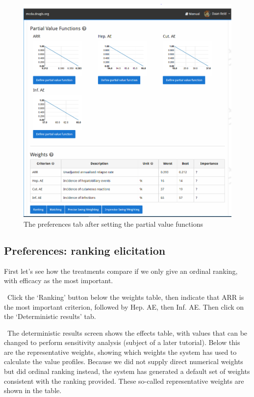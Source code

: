 \documentclass[00_mcda_tutorial.tex]{subfiles}
\begin{document}
\begin{figure}[!h]
    \centering
	\includegraphics[width=\textwidth]{fig/preferences.png}
    \caption{The preferences tab after setting the partial value functions}
	\label{fig:preferences}
\end{figure}

\subsection*{Preferences: ranking elicitation}
First let’s see how the treatments compare if we only give an ordinal ranking, with efficacy as the most important.
\newline

\noindent \leftpointright \, Click the ‘Ranking’ button below the weights table, then indicate that ARR is the most important criterion, followed by Hep. AE, then Inf. AE. Then click on the ‘Deterministic results’ tab.
\newline

\noindent \faGraduationCap \, The deterministic results screen shows the effects table, with values that can be changed to perform sensitivity analysis (subject of a later tutorial). Below this are the representative weights, showing which weights the system has used to calculate the value profiles. Because we did not supply direct numerical weights but did ordinal ranking instead, the system has generated a default set of weights consistent with the ranking provided. These so-called representative weights are shown in the table.
\newline
\end{document}
